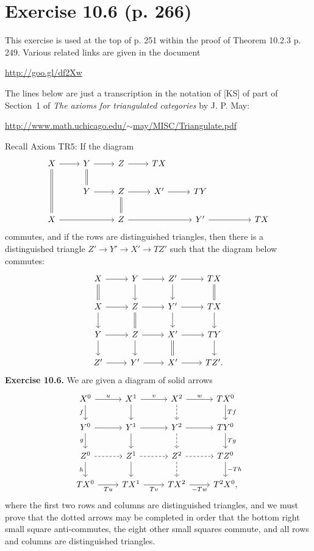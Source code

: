 \documentclass[12pt]{article}
\theoremstyle{remark}
\newcommand{\n}{\noindent}
\begin{document}
\section{Exercise 10.6 (p. 266)}%
%
This exercise is used at the top of p. 251 within the proof of Theorem 10.2.3 p. 249. Various related links are given in the document\smallskip

\centerline{\href{http://goo.gl/df2Xw}{http://goo.gl/df2Xw}}

\n The lines below are just a transcription in the notation of [KS] of part of Section~1 of \emph{The axioms for triangulated categories} by J. P. May:\smallskip

\centerline{\href{http://www.math.uchicago.edu/~may/MISC/Triangulate.pdf}{http://www.math.uchicago.edu/$\sim$may/MISC/Triangulate.pdf}}

Recall Axiom TR5: If the diagram
$$
\begin{tikzcd}
X\ar[equal]{dd}\ar{r}&Y\ar[equal]{d}\ar{r}&Z\ar{r}&TX\\
&Y\ar{r}&Z\ar[equal]{d}\ar{r}&X'\ar{r}&TY\\
X\ar{rr}&&Z\ar{rr}&&Y'\ar{rr}&&TX
\end{tikzcd}
$$
commutes, and if the rows are distinguished triangles, then there is a distinguished triangle $Z'\to Y'\to X'\to TZ'$ such that the diagram below commutes:
$$
\begin{tikzcd}
X\ar{r}\ar[equal]{d}&Y\ar{d}\ar{r}&Z'\ar{d}\ar{r}&TX\ar[equal]{d}\\
X\ar{d}\ar{r}&Z\ar{r}\ar[equal]{d}&Y'\ar{d}\ar{r}&TX\ar{d}\\
Y\ar{d}\ar{r}&Z\ar{d}\ar{r}&X'\ar{r}\ar[equal]{d}&TY\ar{d}\\
Z'\ar{r}&Y'\ar{r}&X'\ar{r}&TZ'.
\end{tikzcd}
$$
\textbf{Exercise 10.6.} We are given a diagram of solid arrows 
$$
\begin{tikzcd}
X^0\ar{r}{u}\ar{d}[swap]{f}&X^1\ar{d}\ar{r}{v}&X^2\ar[dashed]{d}\ar{r}{w}&TX^0\ar{d}{Tf}\\ 
Y^0\ar{r}\ar{d}[swap]{g}&Y^1\ar{d}\ar{r}&Y^2\ar[dashed]{d}\ar{r}&TY^0\ar{d}{Tg}\\ 
Z^0\ar[dashed]{r}\ar{d}[swap]{h}&Z^1\ar{d}\ar[dashed]{r}&Z^2\ar[dashed]{d}\ar[dashed]{r}&TZ^0\ar{d}{-Th}\\ 
TX^0\ar{r}[swap]{Tu}&TX^1\ar{r}[swap]{Tv}&TX^2\ar{r}[swap]{-Tw}&T^2X^0,
\end{tikzcd}
$$
where the first two rows and columns are distinguished triangles, and we must prove that the dotted arrows may be completed in order that the bottom right small square anti-commutes, the eight other small squares commute, and all rows and columns are distinguished triangles.
\end{document}
